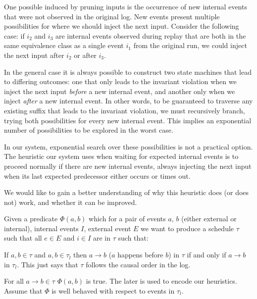 One possible induced by pruning inputs is the occurrence of new
internal events that were not observed in the original log.
New events present multiple possibilities for where
we should inject the next input. Consider the following case:
if $i_2$ and $i_3$ are internal events observed
during replay that are both in the same equivalence class as a single event $i_1$ from the
original run, we could inject the next input after $i_2$ or after $i_3$.


In the general case it is always possible to construct two state machines that lead
to differing outcomes: one that only leads to the invariant violation when
we inject the next input
\emph{before} a new internal event, and another only when we inject \emph{after} a new internal
event. In other words, to be guaranteed to traverse any existing suffix that leads
to the invariant violation, we must recursively branch, trying both
possibilities for every new internal event. This implies an exponential number of
possibilities to be explored in the worst case.

In our system, exponential search over these possibilities is not a practical option.
The heuristic our system uses when waiting for expected internal
events is to proceed normally if there are new internal events,
always injecting the next input when its last expected predecessor
either occurs or times out.

We would like to gain a better understanding of why this heuristic does (or
does not) work, and whether it can be improved.

 Given a predicate $\Phi(a, b)$ which for a pair of events $a$, $b$ 
(either external or internal), internal events $I$, external event $E$ we want to produce a schedule $\tau$ such that all $e\in E$ and $i\in
I$ are in $\tau$ such that:

If $a, b \in \tau$ and $a, b\in \tau_l$ then $a \rightarrow b$ ($a$ happens before $b$) in $\tau$ if and only if $a
\rightarrow b$ in $\tau_l$. This just says that $\tau$ follows the causal order in the log.

For all $a\rightarrow b\in \tau$ $\Phi(a, b)$ is true. The later is used to encode our heuristics. Assume that $\Phi$ is
well behaved with respect to events in $\tau_l$.

